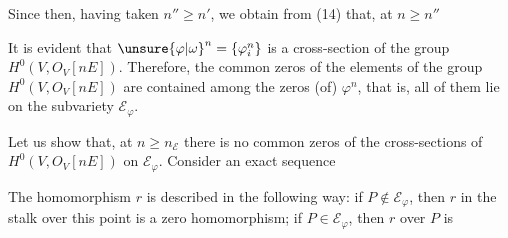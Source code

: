 Since
then, having taken $n''\geq n'$, we obtain from (14) that, at $n\geq n''$
\handwritten{\[
\begin{aligned}
&\dim H^1(V,O_V[nE])=\\
&=\dim H^1(V,O_V(-\mathscr{E}_{\varphi})[nE])=\dim H^1(V,O_V[(n-1)E]).
\end{aligned}
\tag*{(15)}
\]}

It is evident that $\unsure{\varphi|\omega}^{n}=\{\varphi_i^{n}\}$ is a cross-section of the group $H^0(V,O_V[nE])$. Therefore, the common zeros of the elements of the group $H^0(V,O_V[nE])$ are contained among the zeros (of) $\varphi^n$, that is, all of them lie on the subvariety $\mathscr{E}_{\varphi}$.

Let us show that, at $n\geq n_{\mathscr{E}}$ there is no common zeros of the cross-sections of $H^0(V,O_V[nE])$ on $\mathscr{E}_{\varphi}$. Consider an exact sequence

The homomorphism $r$ is described in the following way: if $P\notin\mathscr{E}_{\varphi}$, then $r$ in the stalk over this point is a zero homomorphism; if $P\in\mathscr{E}_{\varphi}$, then $r$ over $P$ is
